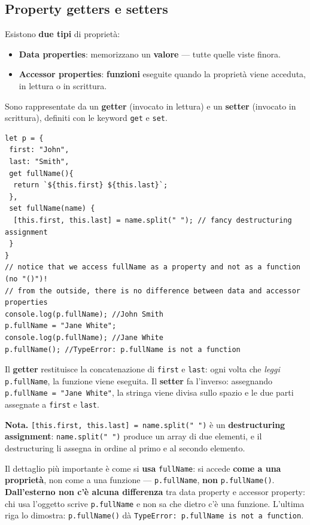 \documentclass[10pt,a4paper]{article}
\newcommand{\nota}[1]{\textbf{\textcolor{ngreen}{Nota.}} #1}
\begin{document}
\subsection{Property getters e setters}

Esistono \textbf{due tipi} di proprietà:

\begin{itemize}
  \item \textbf{Data properties}: memorizzano un \textbf{valore} --- tutte quelle viste finora.
  \item \textbf{Accessor properties}: \textbf{funzioni} eseguite quando la proprietà viene acceduta, in lettura o in scrittura.
\end{itemize}

Sono rappresentate da un \textbf{getter} (invocato in lettura) e un \textbf{setter} (invocato in scrittura), definiti con le keyword \texttt{get} e \texttt{set}.

\begin{lstlisting}[style=js]
let p = {
 first: "John",
 last: "Smith",
 get fullName(){
  return `${this.first} ${this.last}`;
 },
 set fullName(name) {
  [this.first, this.last] = name.split(" "); // fancy destructuring assignment
 }
}
// notice that we access fullName as a property and not as a function (no "()")!
// from the outside, there is no difference between data and accessor properties
console.log(p.fullName); //John Smith
p.fullName = "Jane White";
console.log(p.fullName); //Jane White
p.fullName(); //TypeError: p.fullName is not a function
\end{lstlisting}

Il \textbf{getter} restituisce la concatenazione di \texttt{first} e \texttt{last}: ogni volta che \emph{leggi} \texttt{p.fullName}, la funzione viene eseguita. Il \textbf{setter} fa l'inverso: assegnando \texttt{p.fullName = "Jane White"}, la stringa viene divisa sullo spazio e le due parti assegnate a \texttt{first} e \texttt{last}.

\begin{notebox}
\nota{\texttt{[this.first, this.last] = name.split(" ")} è un \textbf{destructuring assignment}: \texttt{name.split(" ")} produce un array di due elementi, e il destructuring li assegna in ordine al primo e al secondo elemento.}
\end{notebox}

Il dettaglio più importante è come si \textbf{usa} \texttt{fullName}: si accede \textbf{come a una proprietà}, non come a una funzione --- \texttt{p.fullName}, \textbf{non} \texttt{p.fullName()}. \textbf{Dall'esterno non c'è alcuna differenza} tra data property e accessor property: chi usa l'oggetto scrive \texttt{p.fullName} e non sa che dietro c'è una funzione. L'ultima riga lo dimostra: \texttt{p.fullName()} dà \texttt{TypeError: p.fullName is not a function}.
\end{document}
